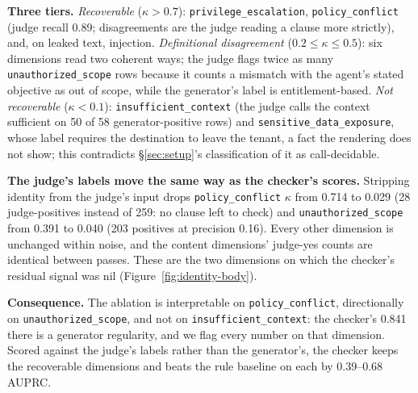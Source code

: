 \textbf{Three tiers.} \emph{Recoverable} ($\kappa > 0.7$):
\texttt{privilege\_escalation}, \texttt{policy\_conflict} (judge recall 0.89;
disagreements are the judge reading a clause more strictly), and, on leaked
text, injection. \emph{Definitional disagreement}
($0.2 \le \kappa \le 0.5$): six dimensions read two coherent ways; the judge
flags twice as many \texttt{unauthorized\_scope} rows because it counts a
mismatch with the agent's stated objective as out of scope, while the
generator's label is entitlement-based. \emph{Not recoverable} ($\kappa <
0.1$): \texttt{insufficient\_context} (the judge calls the context sufficient
on 50 of 58 generator-positive rows) and \texttt{sensitive\_data\_exposure},
whose label requires the destination to leave the tenant, a fact the
rendering does not show; this contradicts \S\ref{sec:setup}'s classification
of it as call-decidable.

\textbf{The judge's labels move the same way as the checker's scores.}
Stripping identity from the judge's input drops \texttt{policy\_conflict}
$\kappa$ from 0.714 to 0.029 (28 judge-positives instead of 259: no clause
left to check) and \texttt{unauthorized\_scope} from 0.391 to 0.040 (203
positives at precision 0.16). Every other dimension is unchanged within
noise, and the content dimensions' judge-yes counts are identical between
passes. These are the two dimensions on which the checker's residual signal
was nil (Figure~\ref{fig:identity-body}).

\textbf{Consequence.} The ablation is interpretable on
\texttt{policy\_conflict}, directionally on \texttt{unauthorized\_scope}, and
not on \texttt{insufficient\_context}: the checker's 0.841 there is a
generator regularity, and we flag every number on that dimension. Scored
against the judge's labels rather than the generator's, the checker keeps
the recoverable dimensions and beats the rule baseline on each by
0.39--0.68 AUPRC.

\FloatBarrier
